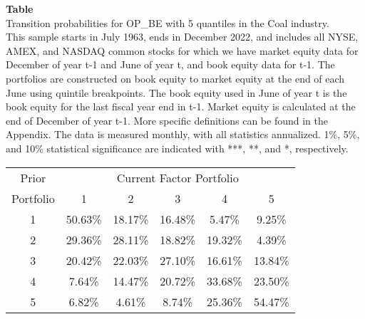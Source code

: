 \begin{table*}[ht!]
\raggedright
{}
\label{tab: transition_probs_OP_BE_Coal_with_5_quantiles}
\textbf{Table \thetable} \\
Transition probabilities for OP_BE with 5 quantiles in the Coal industry. \\
\hspace*{1em}This sample starts in July 1963, ends in December 2022, and includes all NYSE, AMEX, and NASDAQ common stocks for which we have market equity data for December of year t-1 and June of year t, and book equity data for t-1. The portfolios are constructed on book equity to market equity at the end of each June using quintile breakpoints.  The book equity used in June of year t is the book equity for the last fiscal year end in t-1.  Market equity is calculated at the end of December of year t-1.  More specific definitions can be found in the Appendix.  The data is measured monthly, with all statistics annualized.  1\%, 5\%, and 10\% statistical significance are indicated with ***, **, and *, respectively. \\
\vspace{0.5em}
\centering
\begin{adjustbox}{max width=\textwidth}
\begin{tabular}{@{}cccccc@{}}
\toprule
Prior & \multicolumn{5}{c}{Current Factor Portfolio} \\
Portfolio & 1 & 2 & 3 & 4 & 5 \\
\midrule
1 & 50.63\% & 18.17\% & 16.48\% & 5.47\% & 9.25\% \\
2 & 29.36\% & 28.11\% & 18.82\% & 19.32\% & 4.39\% \\
3 & 20.42\% & 22.03\% & 27.10\% & 16.61\% & 13.84\% \\
4 & 7.64\% & 14.47\% & 20.72\% & 33.68\% & 23.50\% \\
5 & 6.82\% & 4.61\% & 8.74\% & 25.36\% & 54.47\% \\
\bottomrule
\end{tabular}
\end{adjustbox}
\end{table*}